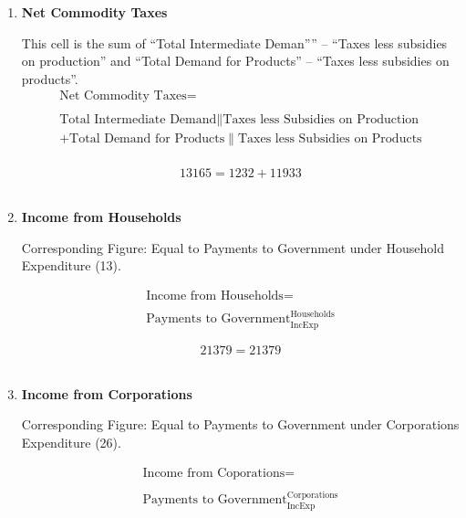 \begin{enumerate}
\item \textbf {Net Commodity Taxes}

This cell is the sum of ``Total Intermediate Deman''” – ``Taxes less subsidies on production'' and ``Total Demand for Products'' – ``Taxes less subsidies on products''. \cite{ScotGov2013a}\\

\begin{equation}
\begin{split}
\text{Net Commodity Taxes} =  \\ \\
\text{Total Intermediate Demand}\|\text{Taxes less Subsidies on Production}\\
+\text{Total Demand for Products}\|\text{Taxes less Subsidies on Products}\\
\end{split} \label{eq:2.5.36}
\end{equation}

\begin{equation} \nonumber
13165 = 1232+11933
\end{equation}\\


\item \textbf {Income from Households}

Corresponding Figure: Equal to Payments to Government under Household Expenditure (13).

\begin{equation}
\begin{split}
\text{Income from Households} =  \\ \\
\text{Payments to Government}^\text{Households}_\text{IncExp}
\end{split} \label{eq:2.5.37}
\end{equation}

\begin{equation} \nonumber
21379 = 21379
\end{equation}\\


\item \textbf {Income from Corporations}

Corresponding Figure: Equal to Payments to Government under Corporations Expenditure (26).

\begin{equation}
\begin{split}
\text{Income from Coporations} =  \\ \\
\text{Payments to Government}^\text{Corporations}_\text{IncExp}
\end{split} \label{eq:2.5.38}
\end{equation}


\end{enumerate}
